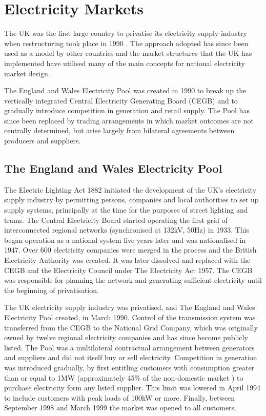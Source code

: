 \section{Electricity Markets}
The UK was the first large country to privatise its electricity supply industry
when restructuring took place in 1990 \cite{newbery:2005}.  The approach
adopted has since been used as a model by other countries and the market
structures that the UK has implemented have utilised many of the main
concepts for national electricity market design.

The England and Wales Electricity Pool was created in 1990 to break up the
vertically integrated Central Electricity Generating Board (CEGB) and to
gradually introduce competition in generation and retail supply.
The Pool has since been
replaced by trading arrangements in which market outcomes are not centrally
determined, but arise largely from bilateral agreements between producers and
suppliers.

\subsection{The England and Wales Electricity Pool}
\label{sec:thepool}
The Electric Lighting Act 1882 initiated the development of the UK's electricity
supply industry by permitting persons, companies and local authorities to set up
supply systems, principally at the time for the purposes of street lighting and
trams.  The Central Electricity Board started operating the first grid of
interconnected regional networks (synchronised at 132kV, 50Hz) in 1933. This
began operation as a national system five years later and was nationalised in
1947.  Over 600 electricity companies were merged in the process and the British
Electricity Authority was created.  It was later dissolved and replaced with the
CEGB and the Electricity Council under The Electricity Act 1957.  The CEGB was
responsible for planning the network and generating sufficient electricity until
the beginning of privatisation.

The UK electricity supply industry was privatised, and The England and Wales
Electricity Pool created, in March 1990.  Control of the transmission system was
transferred from the CEGB to the National Grid Company, which was originally
owned by twelve regional electricity companies and has since become publicly
listed.  The Pool was a multilateral contractual arrangement between generators
and suppliers and did not itself buy or sell electricity.  Competition in
generation was introduced gradually, by first entitling customers with
consumption greater than or equal to 1MW (approximately 45\% of the non-domestic
market \cite{decc:dukes09}) to purchase electricity form any listed supplier.
This limit was lowered in April 1994 to include customers with peak loads of
100kW or more.  Finally, between September 1998 and March 1999 the market was
opened to all customers.

